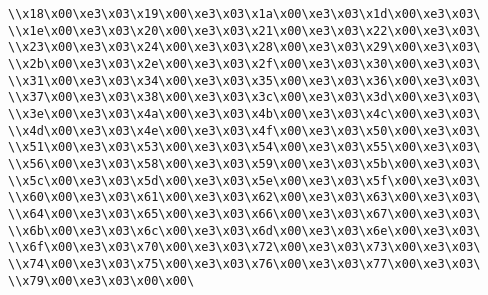 \verb|\\x18\x00\xe3\x03\x19\x00\xe3\x03\x1a\x00\xe3\x03\x1d\x00\xe3\x03\|\newline
\verb|\\x1e\x00\xe3\x03\x20\x00\xe3\x03\x21\x00\xe3\x03\x22\x00\xe3\x03\|\newline
\verb|\\x23\x00\xe3\x03\x24\x00\xe3\x03\x28\x00\xe3\x03\x29\x00\xe3\x03\|\newline
\verb|\\x2b\x00\xe3\x03\x2e\x00\xe3\x03\x2f\x00\xe3\x03\x30\x00\xe3\x03\|\newline
\verb|\\x31\x00\xe3\x03\x34\x00\xe3\x03\x35\x00\xe3\x03\x36\x00\xe3\x03\|\newline
\verb|\\x37\x00\xe3\x03\x38\x00\xe3\x03\x3c\x00\xe3\x03\x3d\x00\xe3\x03\|\newline
\verb|\\x3e\x00\xe3\x03\x4a\x00\xe3\x03\x4b\x00\xe3\x03\x4c\x00\xe3\x03\|\newline
\verb|\\x4d\x00\xe3\x03\x4e\x00\xe3\x03\x4f\x00\xe3\x03\x50\x00\xe3\x03\|\newline
\verb|\\x51\x00\xe3\x03\x53\x00\xe3\x03\x54\x00\xe3\x03\x55\x00\xe3\x03\|\newline
\verb|\\x56\x00\xe3\x03\x58\x00\xe3\x03\x59\x00\xe3\x03\x5b\x00\xe3\x03\|\newline
\verb|\\x5c\x00\xe3\x03\x5d\x00\xe3\x03\x5e\x00\xe3\x03\x5f\x00\xe3\x03\|\newline
\verb|\\x60\x00\xe3\x03\x61\x00\xe3\x03\x62\x00\xe3\x03\x63\x00\xe3\x03\|\newline
\verb|\\x64\x00\xe3\x03\x65\x00\xe3\x03\x66\x00\xe3\x03\x67\x00\xe3\x03\|\newline
\verb|\\x6b\x00\xe3\x03\x6c\x00\xe3\x03\x6d\x00\xe3\x03\x6e\x00\xe3\x03\|\newline
\verb|\\x6f\x00\xe3\x03\x70\x00\xe3\x03\x72\x00\xe3\x03\x73\x00\xe3\x03\|\newline
\verb|\\x74\x00\xe3\x03\x75\x00\xe3\x03\x76\x00\xe3\x03\x77\x00\xe3\x03\|\newline
\verb|\\x79\x00\xe3\x03\x00\x00\|\newline
